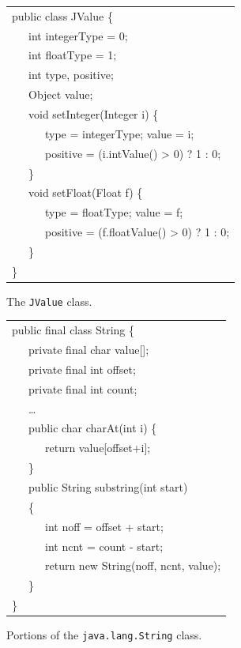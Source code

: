 \documentclass{acmconf}
\begin{document}
\begin{figure}[tp]
\renewcommand{\baselinestretch}{0.6}%
{\small\tt\renewcommand{\>}{~~~}\begin{tabular}[t]{l}%
public class JValue \{ \\
\>int integerType = 0;\\
\>int floatType = 1;\\
\>int type, positive;\\
\>Object value;\\
\>void setInteger(Integer i) \{ \\
\>\>type = integerType; value = i;\\
\>\>positive = (i.intValue() > 0) ? 1 : 0;\\
\>\}\\
\>void setFloat(Float f) \{ \\
\>\>type = floatType; value = f;\\
\>\>positive = (f.floatValue() > 0) ? 1 : 0;\\
\>\}\\
\}
\end{tabular}}%
\caption{The {\tt JValue} class.}
\label{fig:value}
\end{figure}
\begin{figure}[tp]
\renewcommand{\baselinestretch}{0.6}%
{\small\tt\renewcommand{\>}{~~~}\begin{tabular}[t]{l}%
public final class String \{\\
\>private final char value[];\\
\>private final int offset;\\
\>private final int count;\\
\>\ldots\\
\>public char charAt(int i) \{\\
\>\>return value[offset+i];\\
\>\}\\
\>public String substring(int start)\\
\>\{\\
\>\>int noff = offset + start;\\
\>\>int ncnt = count - start;\\
\>\>return new String(noff, ncnt, value);\\
\>\}\\
\}\\
\end{tabular}}%
\caption{Portions of the {\tt java.lang.String} class.}
\label{fig:string}
\end{figure}
\end{document}
